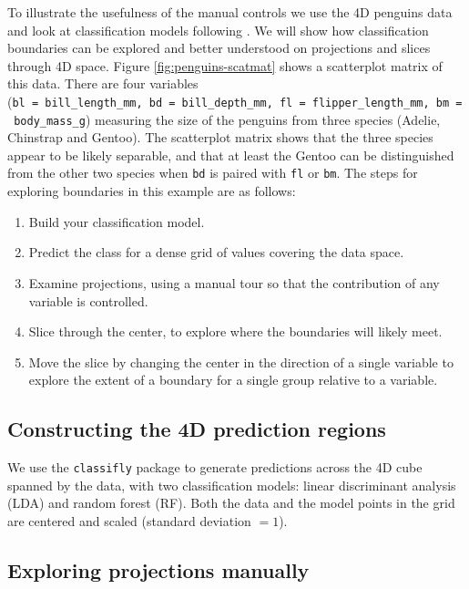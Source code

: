 \documentclass[]{interact}
\theoremstyle{plain}%
\theoremstyle{definition}
\theoremstyle{remark}
\def\tightlist{}
\begin{document}
To illustrate the usefulness of the manual controls we use the 4D
penguins data \citep{penguins} and look at classification models
following \citet{sam11271}. We will show how classification boundaries
can be explored and better understood on projections and slices through
4D space. Figure \ref{fig:penguins-scatmat} shows a scatterplot matrix
of this data. There are four variables
(\texttt{bl\ =\ bill\_length\_mm,\ bd\ =\ bill\_depth\_mm,\ fl\ =\ flipper\_length\_mm,\ bm\ =\ body\_mass\_g})
measuring the size of the penguins from three species (Adelie, Chinstrap
and Gentoo). The scatterplot matrix shows that the three species appear
to be likely separable, and that at least the Gentoo can be
distinguished from the other two species when \texttt{bd} is paired with
\texttt{fl} or \texttt{bm}. The steps for exploring boundaries in this
example are as follows:

\begin{enumerate}
\def\labelenumi{\arabic{enumi}.}
\tightlist
\item
  Build your classification model.
\item
  Predict the class for a dense grid of values covering the data space.
\item
  Examine projections, using a manual tour so that the contribution of
  any variable is controlled.
\item
  Slice through the center, to explore where the boundaries will likely
  meet.
\item
  Move the slice by changing the center in the direction of a single
  variable to explore the extent of a boundary for a single group
  relative to a variable.
\end{enumerate}

\hypertarget{constructing-the-4d-prediction-regions}{%
\subsection{Constructing the 4D prediction
regions}\label{constructing-the-4d-prediction-regions}}

We use the \texttt{classifly} package \citep{classifly} to generate
predictions across the 4D cube spanned by the data, with two
classification models: linear discriminant analysis (LDA) and random
forest (RF). Both the data and the model points in the grid are centered
and scaled (standard deviation \(= 1\)).

\hypertarget{exploring-projections-manually}{%
\subsection{Exploring projections
manually}\label{exploring-projections-manually}}
\end{document}
